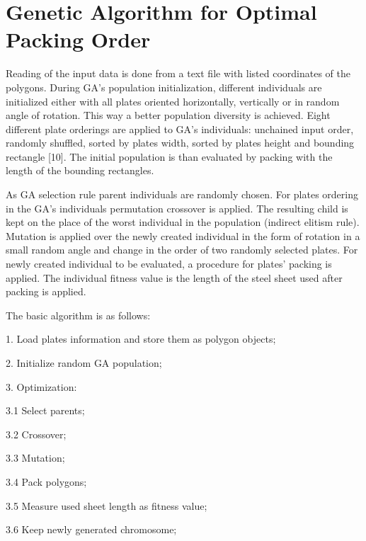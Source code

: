 \documentclass{llncs}
\begin{document}
\section{Genetic Algorithm for Optimal Packing Order}
%
Reading of the input data is done from a text file with listed coordinates of the polygons. During GA's population initialization, different individuals are initialized either with all plates oriented horizontally, vertically or in random angle of rotation. This way a better population diversity is achieved. Eight different plate orderings are applied to GA's individuals: unchained input order, randomly shuffled, sorted by plates width, sorted by plates height and bounding rectangle [10]. The initial population is than evaluated by packing with the length of the bounding rectangles. 

As GA selection rule parent individuals are randomly chosen. For plates ordering in the GA's individuals permutation crossover is applied. The resulting child is kept on the place of the worst individual in the population (indirect elitism rule). Mutation is applied over the newly created individual in the form of rotation in a small random angle and change in the order of two randomly selected plates. For newly created individual to be evaluated, a procedure for plates' packing is applied. The individual fitness value is the length of the steel sheet used after packing is applied. 

\vspace{4 mm}
The basic algorithm is as follows:

\vspace{4 mm}
1. Load plates information and store them as polygon objects;

2. Initialize random GA population;

3. Optimization:

\hspace{4 mm} 3.1 Select parents;

\hspace{4 mm} 3.2 Crossover;

\hspace{4 mm} 3.3 Mutation;

\hspace{4 mm} 3.4 Pack polygons;

\hspace{4 mm} 3.5 Measure used sheet length as fitness value;

\hspace{4 mm} 3.6 Keep newly generated chromosome;
\end{document}
